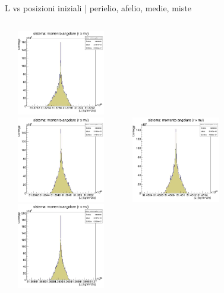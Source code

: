         \begin{frame}{L vs posizioni iniziali | perielio, afelio, medie, miste}
            \begin{columns}
                    \centering        
                    \includegraphics[width=5cm,height=3.75cm]{3_Momento/L_500_peri.jpg}\\
                    \includegraphics[width=5cm,height=3.75cm]{3_Momento/L_500_afe.jpg}
                    \label{cfr::LT5}              
                    \centering        
                    \includegraphics[width=5cm,height=3.75cm]{3_Momento/L_500_medi.jpg}\\
                    \includegraphics[width=5cm,height=3.75cm]{3_Momento/L_500_3600.jpg}
                    \label{cfr::LT6}      
            \end{columns}
        \end{frame}